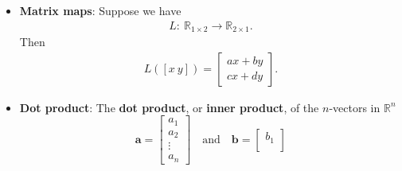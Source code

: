 \documentclass{report}
\begin{document}
\begin{itemize}
            \item \textbf{Matrix maps}:
                Suppose we have 
                \begin{align*}
                    L:\ \mathbb{R}_{1\times 2} \to \mathbb{R}_{2\times 1}
                .\end{align*}
                Then
                \begin{align*}
                    L([x\ y]) = \begin{bmatrix}
                        ax + by \\
                        cx + dy
                    \end{bmatrix}
                .\end{align*}
            \item \textbf{Dot product}:
                The \textbf{dot product}, or \textbf{inner product}, of the $n$-vectors in $\mathbb{R}^n$ 
                \[
                    \mathbf{a} = \begin{bmatrix}
                        a_1 \\
                        a_2 \\
                        \vdots \\
                        a_n
                    \end{bmatrix}
                    \quad \text{and} \quad
                    \mathbf{b} = \begin{bmatrix}
                        b_1 \\

\end{bmatrix}\]
\end{itemize}
\end{document}
